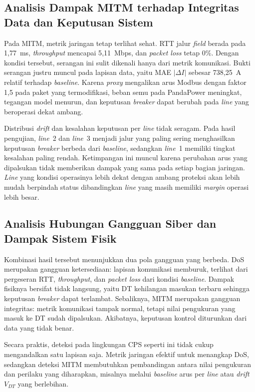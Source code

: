 \subsection{Analisis Dampak MITM terhadap Integritas Data dan Keputusan Sistem}
\label{subsec:analisis_dampak_mitm}
Pada \ac{MITM}, metrik jaringan tetap terlihat sehat. RTT jalur \textit{field} berada pada 1{,}77~ms, \textit{throughput} mencapai 5{,}11~Mbps, dan \textit{packet loss} tetap 0\%. Dengan kondisi tersebut, serangan ini sulit dikenali hanya dari metrik komunikasi. Bukti serangan justru muncul pada lapisan data, yaitu MAE $|\Delta I|$ sebesar 738{,}25~A relatif terhadap \textit{baseline}. Karena \textit{proxy} mengalikan arus Modbus dengan faktor 1{,}5 pada paket yang termodifikasi, beban semu pada PandaPower meningkat, tegangan model menurun, dan keputusan \textit{breaker} dapat berubah pada \textit{line} yang beroperasi dekat ambang.

Distribusi \textit{drift} dan kesalahan keputusan per \textit{line} tidak seragam. Pada hasil pengujian, \textit{line}~2 dan \textit{line}~3 menjadi jalur yang paling sering menghasilkan keputusan \textit{breaker} berbeda dari \textit{baseline}, sedangkan \textit{line}~1 memiliki tingkat kesalahan paling rendah. Ketimpangan ini muncul karena perubahan arus yang dipalsukan tidak memberikan dampak yang sama pada setiap bagian jaringan. \textit{Line} yang kondisi operasinya lebih dekat dengan ambang proteksi akan lebih mudah berpindah status dibandingkan \textit{line} yang masih memiliki \textit{margin} operasi lebih besar. 

\subsection{Analisis Hubungan Gangguan Siber dan Dampak Sistem Fisik}
\label{subsec:analisis_hubungan_gangguan_siber}
Kombinasi hasil tersebut menunjukkan dua pola gangguan yang berbeda. \ac{DoS} merupakan gangguan ketersediaan: lapisan komunikasi memburuk, terlihat dari pergeseran RTT, \textit{throughput}, dan \textit{packet loss} dari kondisi \textit{baseline}. Dampak fisiknya bersifat tidak langsung, yaitu \ac{DT} kehilangan masukan terbaru sehingga keputusan \textit{breaker} dapat terlambat. Sebaliknya, \ac{MITM} merupakan gangguan integritas: metrik komunikasi tampak normal, tetapi nilai pengukuran yang masuk ke \ac{DT} sudah dipalsukan. Akibatnya, keputusan kontrol diturunkan dari data yang tidak benar. 

Secara praktis, deteksi pada lingkungan \ac{CPS} seperti ini tidak cukup mengandalkan satu lapisan saja. Metrik jaringan efektif untuk menangkap \ac{DoS}, sedangkan deteksi \ac{MITM} membutuhkan pembandingan antara nilai pengukuran dan perilaku yang diharapkan, misalnya melalui \textit{baseline} arus per \textit{line} atau \textit{drift} $V_{DT}$ yang berlebihan.

